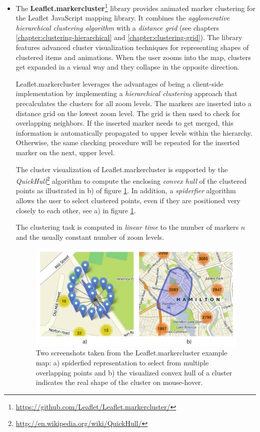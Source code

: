 \begin{itemize}

\item The \textbf{Leaflet.markercluster}\footnote{\url{https://github.com/Leaflet/Leaflet.markercluster/}} library provides animated marker clustering for the Leaflet JavaScript mapping library. It combines the \textit{agglomerative hierarchical clustering algorithm} with a \textit{distance grid} (see chapters \ref{chapter:clustering-hierarchical} and \ref{chapter:clustering-grid}). The library features advanced cluster visualization techniques for representing shapes of clustered items and animations. When the user zooms into the map, clusters get expanded in a visual way and they collapse in the opposite direction.

Leaflet.markercluster leverages the advantages of being a client-side implementation by implementing a \textit{hierarchical clustering} approach that precalculates the clusters for all zoom levels. The markers are inserted into a distance grid on the lowest zoom level. The grid is then used to check for overlapping neighbors. If the inserted marker needs to get merged, this information is automatically propagated to upper levels within the hierarchy. Otherwise, the same checking procedure will be repeated for the inserted marker on the next, upper level.

The cluster visualization of Leaflet.markercluster is supported by the \textit{QuickHull}\footnote{\url{http://en.wikipedia.org/wiki/QuickHull/}} algorithm to compute the enclosing \textit{convex hull} of the clustered points as illustrated in b) of figure \ref{fig:leaflet}. In addition, a \textit{spiderfier} algorithm allows the user to select clustered points, even if they are positioned very closely to each other, see a) in figure \ref{fig:leaflet}.

The clustering task is computed in \textit{linear time} to the number of markers $n$ and the usually constant number of zoom levels. 

\begin{figure}[h]
  \begin{center}
    \includegraphics[width=1\textwidth]{figures/leaflet.pdf}
    \caption{Two screenshots taken from the Leaflet.markercluster example map: a) spiderfied representation to select from multiple overlapping points and b) the visualized convex hull of a cluster indicates the real shape of the cluster on mouse-hover.}
    \label{fig:leaflet}
  \end{center}
\end{figure}


\end{itemize}

